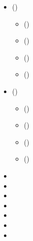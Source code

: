 \documentclass[a4paper,12pt]{article}
\begin{document}
\begin{itemize}
\begin{itemize}
\begin{itemize}
       \begin{itemize}
      \item   ()
      \item   ()
      \item   ()
      \item   ()
      \end{itemize}
   \item robić 1  (5484)
      \begin{itemize}
      \item   ()
      \item   ()
      \item   ()
      \item   ()
      \end{itemize}
    \end{itemize}
  \end{itemize}
\item   ()
  \begin{itemize}
  \item   ()
  \item   ()
  \item   ()
  \item   ()
  \end{itemize}
\item   ()
  \begin{itemize}
  \item   ()
  \item   ()
  \item   ()
  \item   ()
  \end{itemize}
\item 
\item 
\item 
\item 
\item 
\item 
\item 
\end{itemize}
\end{document}
